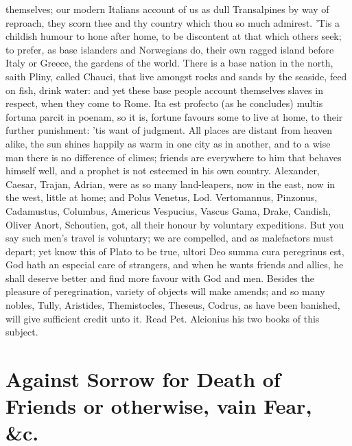 {themselves; our modern Italians account of us as dull Transalpines by
way of reproach, they scorn thee and thy country which thou so much
admirest. 'Tis a childish humour to hone after home, to be discontent
at that which others seek; to prefer, as base islanders and Norwegians
do, their own ragged island before Italy or Greece, the gardens of the
world. There is a base nation in the north, saith Pliny, called
Chauci, that live amongst rocks and sands by the seaside, feed on fish,
drink water: and yet these base people account themselves slaves in
respect, when they come to Rome. Ita est profecto (as he concludes)
multis fortuna parcit in poenam, so it is, fortune favours some to live
at home, to their further punishment: 'tis want of judgment. All places
are distant from heaven alike, the sun shines happily as warm in one
city as in another, and to a wise man there is no difference of climes;
friends are everywhere to him that behaves himself well, and a prophet
is not esteemed in his own country. Alexander, Caesar, Trajan, Adrian,
were as so many land-leapers, now in the east, now in the west, little
at home; and Polus Venetus, Lod. Vertomannus, Pinzonus, Cadamustus,
Columbus, Americus Vespucius, Vascus Gama, Drake, Candish, Oliver
Anort, Schoutien, got, all their honour by voluntary expeditions. But
you say such men's travel is voluntary; we are compelled, and as
malefactors must depart; yet know this of Plato to be true,
ultori Deo summa cura peregrinus est, God hath an especial care of
strangers, and when he wants friends and allies, he shall deserve
better and find more favour with God and men. Besides the pleasure of
peregrination, variety of objects will make amends; and so many nobles,
Tully, Aristides, Themistocles, Theseus, Codrus, \etc{} as have been
banished, will give sufficient credit unto it. Read Pet. Alcionius his
two books of this subject.


\section{Against Sorrow for Death of Friends or otherwise, vain Fear, \&c.}

}
